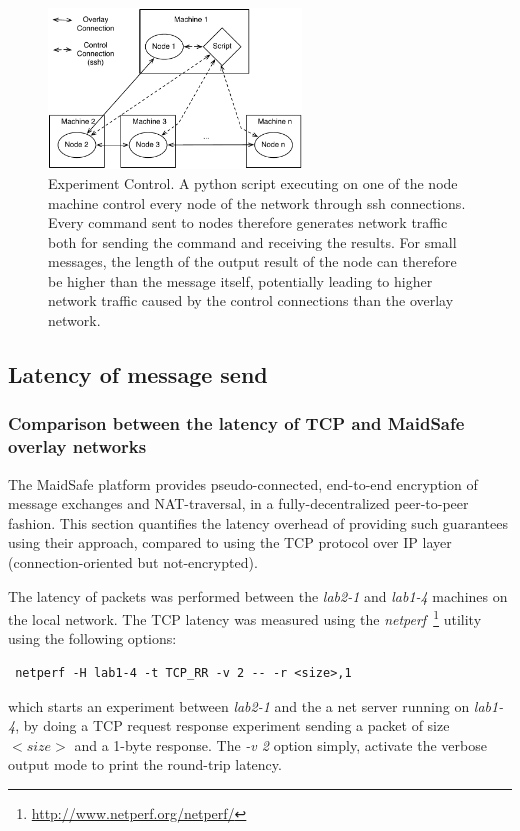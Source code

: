 \begin{figure}[htb]
\begin{center}
\includegraphics[width=0.6\textwidth]{figures/ExperimentControl}
\caption[Experiment Control.]{\label{fig:ExperimentControl} Experiment Control. A python script executing on one of the node machine control every node of the network  through ssh connections. Every command sent to nodes therefore generates network traffic both for sending the command and receiving the results. For small messages, the length of the output result of the node can therefore be higher than the message itself, potentially leading to higher network traffic caused by the control connections than the overlay network.                                                                                                                                                                                                                                                                                               }
\end{center}
\end{figure}

\subsection{Latency of message send}

\subsubsection{Comparison between the latency of TCP and MaidSafe overlay networks}

The MaidSafe platform provides pseudo-connected, end-to-end encryption of message exchanges and NAT-traversal, in a fully-decentralized peer-to-peer fashion. This section quantifies the latency overhead of providing such guarantees using their approach, compared to using the TCP protocol over IP layer (connection-oriented but not-encrypted).

The latency of packets was performed between the \textit{lab2-1} and \textit{lab1-4} machines on the local network. The TCP latency was measured using the \textit{netperf}~\footnote{\url{http://www.netperf.org/netperf/}} utility using the following options:
\begin{verbatim} netperf -H lab1-4 -t TCP_RR -v 2 -- -r <size>,1 \end{verbatim}
which starts an experiment between \textit{lab2-1} and the a net server running on \textit{lab1-4}, by doing a TCP request response experiment sending a packet of size $<size>$ and a 1-byte response. The \textit{-v 2} option simply, activate the verbose output mode to print the round-trip latency.

